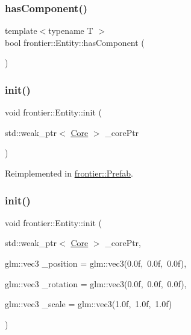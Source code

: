 \subsubsection{\texorpdfstring{has\+Component()}{hasComponent()}}
{\footnotesize\ttfamily template$<$typename T $>$ \\
bool frontier\+::\+Entity\+::has\+Component (\begin{DoxyParamCaption}{ }\end{DoxyParamCaption})\hspace{0.3cm}{\ttfamily [inline]}}

\mbox{\label{classfrontier_1_1_entity_a9a37ec4188e73c190471a5de2db21c77}} 
\subsubsection{\texorpdfstring{init()}{init()}\hspace{0.1cm}{\footnotesize\ttfamily [1/3]}}
{\footnotesize\ttfamily void frontier\+::\+Entity\+::init (\begin{DoxyParamCaption}\item[{std\+::weak\+\_\+ptr$<$ \hyperlink{classfrontier_1_1_core}{Core} $>$}]{\+\_\+core\+Ptr }\end{DoxyParamCaption})\hspace{0.3cm}{\ttfamily [virtual]}}



Reimplemented in \hyperlink{classfrontier_1_1_prefab_a6f41f76c2c8484ba9d4451a936f43e42}{frontier\+::\+Prefab}.

\mbox{\label{classfrontier_1_1_entity_a8dd740cd4134ddab40663239527959e1}} 
\subsubsection{\texorpdfstring{init()}{init()}\hspace{0.1cm}{\footnotesize\ttfamily [2/3]}}
{\footnotesize\ttfamily void frontier\+::\+Entity\+::init (\begin{DoxyParamCaption}\item[{std\+::weak\+\_\+ptr$<$ \hyperlink{classfrontier_1_1_core}{Core} $>$}]{\+\_\+core\+Ptr,  }\item[{glm\+::vec3}]{\+\_\+position = {\ttfamily glm\+:\+:vec3(0.0f,~0.0f,~0.0f)},  }\item[{glm\+::vec3}]{\+\_\+rotation = {\ttfamily glm\+:\+:vec3(0.0f,~0.0f,~0.0f)},  }\item[{glm\+::vec3}]{\+\_\+scale = {\ttfamily glm\+:\+:vec3(1.0f,~1.0f,~1.0f)} }\end{DoxyParamCaption})}


